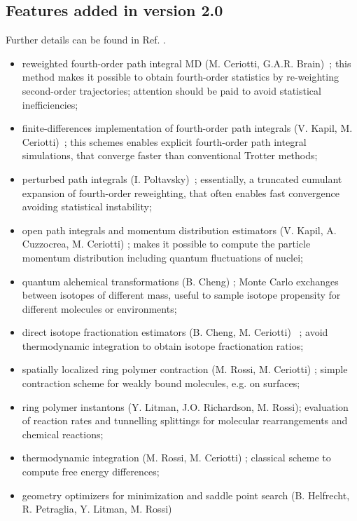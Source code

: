 \documentclass[11pt,english,fleqn]{report}
\begin{document}
\subsection{Features added in version 2.0}

Further details can be found in Ref. \cite{Kapil:2019ju}.

\begin{itemize}
\item reweighted fourth-order path integral MD (M. Ceriotti, G.A.R. Brain)~\cite{ceri+12prsa,jang-voth01jcp}; {this method makes it possible to obtain fourth-order statistics by re-weighting second-order trajectories; attention should be paid to avoid statistical inefficiencies;}
\item finite-differences implementation of fourth-order path integrals (V. Kapil, M. Ceriotti)~\cite{kapi+16jcp2}; {this schemes enables explicit fourth-order path integral simulations, that converge faster than conventional Trotter methods};
\item perturbed path integrals (I. Poltavsky)~\cite{polt-tkat16cs}; {essentially, a truncated cumulant expansion of fourth-order reweighting, that often enables fast convergence avoiding statistical instability; }
\item open path integrals and momentum distribution estimators (V. Kapil, A. Cuzzocrea, M. Ceriotti) \cite{kapi+18jpcb}; {makes it possible to compute the particle momentum distribution including quantum fluctuations of nuclei;}
\item quantum alchemical transformations (B. Cheng) \cite{liu+13jpcc,chen+16jpcl}; {Monte Carlo exchanges between isotopes of different mass, useful to sample isotope propensity for different molecules or environments;}
\item direct isotope fractionation estimators (B. Cheng, M. Ceriotti) ~\cite{chen-ceri14jcp}; {avoid thermodynamic integration to obtain isotope fractionation ratios;}
\item spatially localized ring polymer contraction (M. Rossi, M. Ceriotti) \cite{litm+17jcp}; {simple contraction scheme for weakly bound molecules, e.g. on surfaces;}
\item ring polymer instantons (Y. Litman, J.O. Richardson, M. Rossi); {evaluation of reaction rates and tunnelling splittings for molecular rearrangements and chemical reactions;}
\item thermodynamic integration (M. Rossi, M. Ceriotti) \cite{ross+16prl}; {classical scheme to compute free energy differences;}
\item geometry optimizers for minimization and saddle point search (B. Helfrecht, R. Petraglia, Y. Litman, M. Rossi) \cite{ross+16prl}

\end{itemize}
\end{document}
